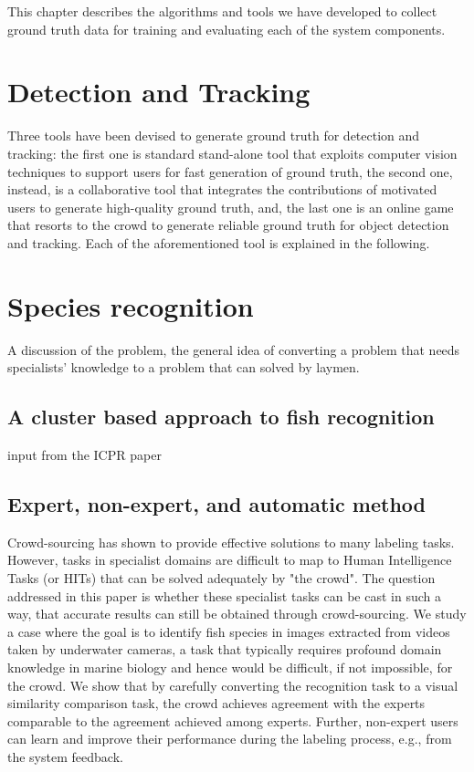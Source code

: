 This chapter describes the algorithms and tools we have developed
to collect ground truth data for training and evaluating
each of the system components.
 
\section{Detection and Tracking}
%
Three tools have been devised to generate ground truth for detection and tracking: the first one is standard stand-alone tool that exploits computer vision techniques to support users for fast generation of ground truth, the second one, instead, is a collaborative tool that integrates the contributions of motivated users to generate high-quality ground truth, and, the last one is an online game that resorts to the crowd to generate reliable ground truth for object detection and tracking.
Each of the aforementioned tool is explained in the following.

\section{Species recognition}

A discussion of the problem, the general idea of converting a
problem that needs specialists' knowledge to a problem that can
solved by laymen. 

\subsection{A cluster based approach to fish recognition}
input from the ICPR paper

\subsection{Expert, non-expert, and automatic method}
%
Crowd-sourcing has shown to provide effective solutions to many
labeling tasks.  However, tasks in specialist domains are difficult to map to
Human Intelligence Tasks (or HITs) that can be solved adequately by "the
crowd". The question addressed in this paper is whether these specialist tasks
can be cast in such a way, that accurate results can still be obtained through
crowd-sourcing.
%
We study a case where the goal is to identify fish species in images extracted
from videos taken by underwater cameras, a task that typically requires
profound domain knowledge in marine biology and hence would be difficult, if
not impossible, for the crowd. 
%
We show that by carefully converting the recognition task to a visual
similarity comparison task, the crowd achieves agreement with the experts
comparable to the agreement achieved among experts.  Further, non-expert users
can learn and improve their performance during the labeling process, e.g., from
the system feedback.
